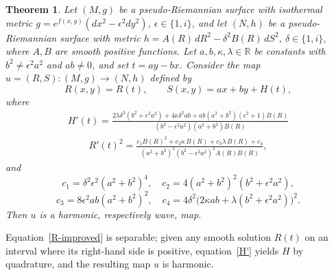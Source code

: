 \documentclass[12pt]{amsart}
\newtheorem{theorem}{Theorem}
\begin{document}
\begin{theorem}\label{Theorem1}
Let $(M,g)$ be a pseudo-Riemannian surface with isothermal metric
$g = e^{f(x,y)}(dx^2 - \epsilon^2 dy^2)$, $\epsilon \in \{1,i\}$,
and let $(N,h)$ be a pseudo-Riemannian surface with metric
$h = A(R)\,dR^2 - \delta^2 B(R)\,dS^2$, $\delta \in \{1,i\}$, where
$A, B$ are smooth positive functions. Let $a, b, \kappa, \lambda \in
\mathbb{R}$ be constants with $b^2 \neq \epsilon^2 a^2$ and $ab \neq 0$, and set
$t = ay - bx$. Consider the map $u = (R,S):(M,g)\to(N,h)$ defined by
\[
R(x,y) = R(t), \qquad S(x,y) = ax + by + H(t),
\]
where
\begin{align}\label{H'}
H'(t) =
\frac{2\lambda\delta^2(b^2 + \epsilon^2 a^2)
     + 4\kappa\delta^2 ab
     + ab(a^2+b^2)(\epsilon^2+1)B(R)}
     {(b^2 - \epsilon^2 a^2)(a^2+b^2)B(R)}
\end{align}
\begin{align}\label{R-improved}
R'(t)^{2}
= \frac{c_{1}B(R)^{2}
       + c_{2}\kappa\, B(R)
       + c_{3}\lambda\, B(R)
       + c_{4}}
       {(a^{2}+b^{2})^{2}(b^{2}-\epsilon^{2}a^{2})^2 A(R)B(R)},
\end{align}
and
\[
c_{1} = \delta^{2}\epsilon^{2}(a^{2}+b^{2})^{4}, \quad
c_{2} = 4(a^{2}+b^{2})^{2}(b^{2}+\epsilon^{2}a^{2}),
\]
\[
c_{3} = 8\epsilon^{2}ab(a^{2}+b^{2})^{2}, \quad
c_{4} = 4\delta^{2}\bigl(2\kappa ab
        + \lambda(b^{2}+\epsilon^{2}a^{2})\bigr)^{2}.
\]
Then $u$ is a harmonic, respectively wave, map. 
\end{theorem}
Equation~\eqref{R-improved} is separable; given any smooth solution
$R(t)$ on an interval where its right-hand side is positive,
equation~\eqref{H'} yields $H$ by quadrature, and the resulting map
$u$ is harmonic.
\end{document}

